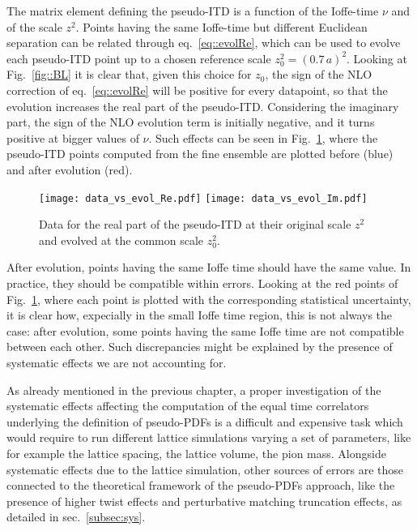 The matrix element defining the pseudo-ITD is a function of the Ioffe-time $\nu$ and of the scale $z^2$.
Points having the same Ioffe-time but different Euclidean separation can be related through eq.~\eqref{eq::evolRe}, 
which can be used to evolve each pseudo-ITD point up to a chosen reference scale $z_0 ^2 = \left(0.7\,a\right)^2$.
Looking at Fig.~\ref{fig::BL} it is clear that, given this choice for $z_0$, the sign of the NLO correction 
of eq.~\eqref{eq::evolRe} will be positive for every datapoint, so that the evolution increases the real part of the pseudo-ITD.
Considering the imaginary part, the sign of the NLO evolution term is initially negative, and it turns positive at bigger values of $\nu$.
Such effects can be seen in Fig.~\ref{fig::evol}, where the pseudo-ITD points computed from the fine ensemble are plotted
before (blue) and after evolution (red). 
\begin{figure}[h!]
    \center
    \texttt{[image: data\_vs\_evol\_Re.pdf]}
    \texttt{[image: data\_vs\_evol\_Im.pdf]}
    \caption{Data for the real part of the pseudo-ITD at their original scale $z^2$ and evolved at the common scale $z_0^2$.}
    \label{fig::evol}
\end{figure}
After evolution, points having the same Ioffe time should have the same value.
In practice, they should be compatible within errors.
Looking at the red points of Fig.~\ref{fig::evol}, where each point is plotted with the corresponding statistical uncertainty, 
it is clear how, expecially in the small Ioffe time region, this is not always the case:
after evolution, some points having the same Ioffe time are not compatible between each other.
Such discrepancies might be explained by the presence of systematic effects we are not accounting for.

% 
As already mentioned in the previous chapter, a proper investigation of the systematic effects affecting
the computation of the equal time correlators underlying
the definition of pseudo-PDFs is a difficult and expensive task which would require to run different lattice simulations 
varying a set of parameters, like for example the lattice spacing, the lattice volume, the pion mass. 
Alongside systematic effects due to the lattice simulation, other sources of errors are those connected 
to the theoretical framework of the pseudo-PDFs approach, like the presence of higher twist effects 
and perturbative matching truncation effects, as detailed in sec.~\ref{subsec:sys}. 
 
